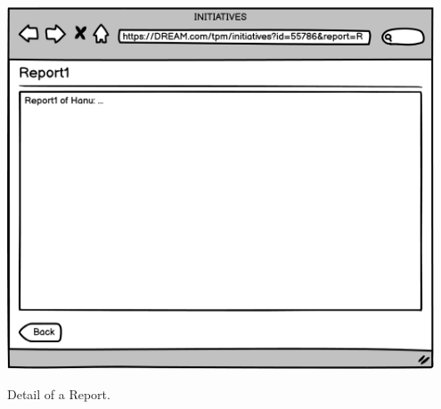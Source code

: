 \begin{minipage}{.5\textwidth}
	\centering
	\includegraphics[width=0.95\textwidth]{Images/Mockup/TPM/13TPMInitiativesReport.png}
	\captionsetup{type=figure}
	\caption{Detail of a Report.}
\end{minipage}


